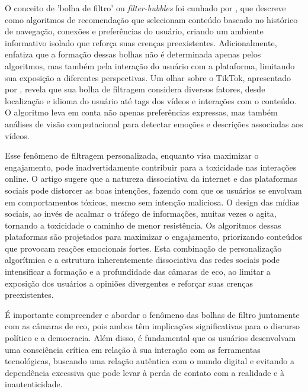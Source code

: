 O conceito de 'bolha de filtro' ou \textit{filter-bubbles} foi cunhado por , que descreve como algoritmos de recomendação que selecionam conteúdo baseado no histórico de navegação, conexões e preferências do usuário, criando um ambiente informativo isolado que reforça suas crenças preexistentes. Adicionalmente,  enfatiza que a formação dessas bolhas não é determinada apenas pelos algoritmos, mas também pela interação do usuário com a plataforma, limitando sua exposição a diferentes perspectivas. Um olhar sobre o TikTok, apresentado por , revela que sua bolha de filtragem considera diversos fatores, desde localização e idioma do usuário até tags dos vídeos e interações com o conteúdo. O algoritmo leva em conta não apenas preferências expressas, mas também análises de visão computacional para detectar emoções e descrições associadas aos vídeos.

Esse fenômeno de filtragem personalizada, enquanto visa maximizar o engajamento, pode inadvertidamente contribuir para a toxicidade nas interações online. O artigo  sugere que a natureza dissociativa da internet e das plataformas sociais pode distorcer as boas intenções, fazendo com que os usuários se envolvam em comportamentos tóxicos, mesmo sem intenção maliciosa. O design das mídias sociais, ao invés de acalmar o tráfego de informações, muitas vezes o agita, tornando a toxicidade o caminho de menor resistência. Os algoritmos dessas plataformas são projetados para maximizar o engajamento, priorizando conteúdos que provocam reações emocionais fortes. Esta combinação de personalização algorítmica e a estrutura inherentemente dissociativa das redes sociais pode intensificar a formação e a profundidade das câmaras de eco, ao limitar a exposição dos usuários a opiniões divergentes e reforçar suas crenças preexistentes.

É importante compreender e abordar o fenômeno das bolhas de filtro juntamente com as câmaras de eco, pois ambos têm implicações significativas para o discurso político e a democracia. Além disso, é fundamental que os usuários desenvolvam uma consciência crítica em relação à sua interação com as ferramentas tecnológicas, buscando uma relação autêntica com o mundo digital e evitando a dependência excessiva que pode levar à perda de contato com a realidade e à inautenticidade.

